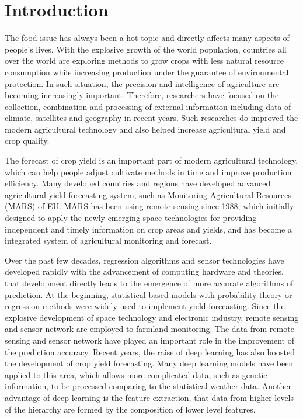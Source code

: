\documentclass[conference, a4paper]{IEEEtran}
\begin{document}
\section{Introduction}
  The food issue has always been a hot topic and directly affects many aspects of people's lives. With the explosive growth of the world population, countries all over the world are exploring methods to grow crops with less natural resource consumption while increasing production under the guarantee of environmental protection. In such situation, the precision and intelligence of agriculture are becoming increasingly important. Therefore, researchers have focused on the collection, combination and processing of external information including data of climate, satellites and geography in recent years. Such researches do improved the modern agricultural technology and also helped increase agricultural yield and crop quality.\par
  The forecast of crop yield is an important part of modern agricultural technology, which can help people adjust cultivate methods in time and improve production efficiency. Many developed countries and regions have developed advanced agricultural yield forecasting system, such as Monitoring Agricultural Resources (MARS) of EU\cite{vanderveldePerformanceMARScropYield2019}. MARS has been using remote sensing since 1988, which initially designed to apply the newly emerging space technologies for providing independent and timely information on crop areas and yields, and has become a integrated system of agricultural monitoring and forecast.\par
  Over the past few decades, regression algorithms and sensor technologies have developed rapidly with the advancement of computing hardware and theories, that development directly leads to the emergence of more accurate algorithms of prediction. At the beginning, statistical-based models with probability theory or regression methods were widely used to implement yield forecasting\cite{matisMarkovChainApproach1985, stephensCropYieldForecasting1995}. Since the explosive development of space technology and electronic industry, remote sensing and sensor network are employed to farmland monitoring.  The data from remote sensing and sensor network have played an important role in the improvement of the prediction accuracy\cite{youDeepGaussianProcess2017, baruthUseRemoteSensing}. Recent years, the raise of deep learning has also boosted the development of crop yield forecasting. Many deep learning models have been applied to this area, which allows more complicated data, such as genetic information, to be processed comparing to the statistical weather data\cite{mateo-sanchisSynergisticIntegrationOptical2019,steenUsingDeepLearning2016a}. Another advantage of deep learning is the feature extraction, that data from higher levels of the hierarchy are formed by the composition of lower level features\cite{lecunDeepLearning2015}.\par
\end{document}
